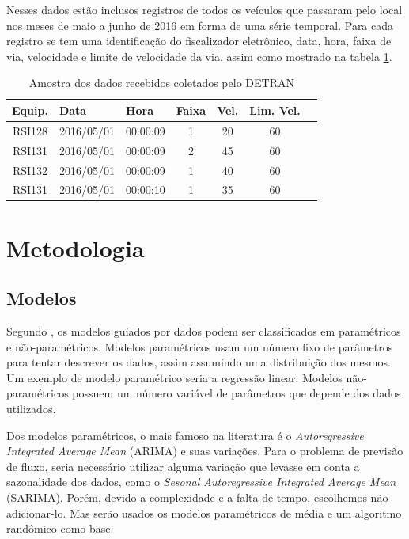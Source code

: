\documentclass[conference]{IEEEtran}
\begin{document}
Nesses dados estão inclusos registros de todos os veículos que passaram pelo local nos meses de maio a junho de 2016 em forma de uma série temporal. Para cada registro se tem uma identificação do fiscalizador eletrônico, data, hora, faixa de via, velocidade e limite de velocidade da via, assim como mostrado na tabela \ref{table:sampleDETRAN}.

\begin{table}[h]
    \caption{Amostra dos dados recebidos coletados pelo DETRAN}
    \label{table:sampleDETRAN}
    \begin{center}
    \begin{tabular}{ccccccc}
    \hline
    \multicolumn{1}{l}{\textbf{Equip.}} & \multicolumn{1}{l}{\textbf{Data}} & \multicolumn{1}{l}{\textbf{Hora}} & \multicolumn{1}{l}{\textbf{Faixa}} & \multicolumn{1}{l}{\textbf{Vel.}} & \multicolumn{1}{l}{\textbf{Lim. Vel.}}\\ 
    \hline
    RSI128 & 2016/05/01 & 00:00:09 & 1 & 20 & 60 \\
    RSI131 & 2016/05/01 & 00:00:09 & 2 & 45 & 60 \\
    RSI132 & 2016/05/01 & 00:00:09 & 1 & 40 & 60 \\
    RSI131 & 2016/05/01 & 00:00:10 & 1 & 35 & 60 \\ 
    \hline
    \end{tabular}
    \end{center}
\end{table}

\section{Metodologia}

\subsection{Modelos}

Segundo \cite{b5}, os modelos guiados por dados podem ser classificados em paramétricos e não-paramétricos. Modelos paramétricos usam um número fixo de parâmetros para tentar descrever os dados, assim assumindo uma distribuição dos mesmos. Um exemplo de modelo paramétrico seria a regressão linear. Modelos não-paramétricos possuem um número variável de parâmetros que depende dos dados utilizados.

Dos modelos paramétricos, o mais famoso na literatura é o \textit{Autoregressive Integrated Average Mean} (ARIMA) e suas variações. Para o problema de previsão de fluxo, seria necessário utilizar alguma variação que levasse em conta a sazonalidade dos dados, como o \textit{Sesonal Autoregressive Integrated Average Mean} (SARIMA). Porém, devido a complexidade e a falta de tempo, escolhemos não adicionar-lo. Mas serão usados os modelos paramétricos de média e um algoritmo randômico como base.
\end{document}

